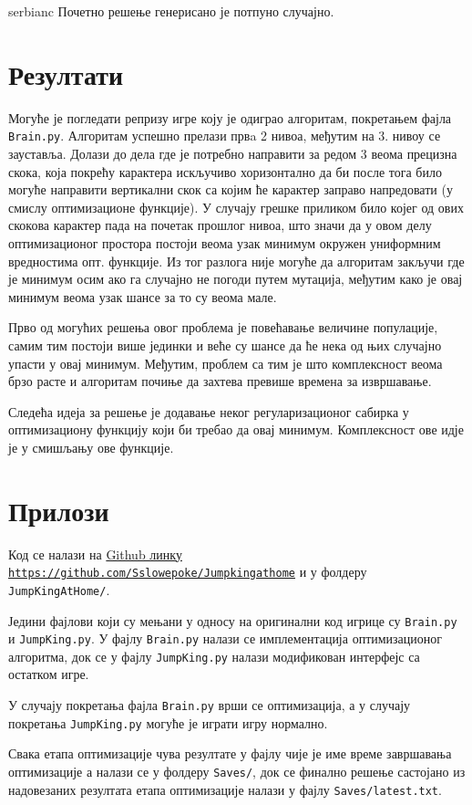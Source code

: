 \documentclass{article}
\begin{document}
\begin{otherlanguage*}{serbianc}
Почетно решење генерисано је потпуно случајно.


\section{Резултати}
Могуће је погледати репризу игре коју је одиграо алгоритам, покретањем фајла
\texttt{Brain.py}.
Алгоритам успешно прелази првa 2 нивоа, међутим на 3. нивоу се зауставља.
Долази до дела где је потребно направити за редом 3 веома прецизна скока, која покрећу карактера искључиво
хоризонтално да би после тога било могуће направити вертикални скок са којим ће карактер заправо напредовати
(у смислу оптимизационе функције).
У случају грешке приликом било којег од ових  скокова карактер пада на почетак прошлог
нивоа, што значи да у овом делу оптимизационог простора постоји веома узак минимум окружен униформним вредностима
опт. функције. Из тог разлога није могуће да алгоритам закључи где је минимум осим ако га
случајно не погоди путем мутација, међутим како је овај минимум веома узак шансе за то су веома мале.

Прво од могућих решења овог проблема је повећавање величине популације, самим тим постоји више јединки и веће
су шансе да ће нека од њих случајно упасти у овај минимум. Међутим, проблем са тим је што комплексност веома брзо расте
и алгоритам почиње да захтева превише времена за извршавање.

Следећа идеја за решење је додавање неког регуларизационог сабирка у оптимизациону функцију који би требао
да \cite{прошири} овај минимум. Комплексност ове идје је у смишљању ове функције.





\section{Прилози}

Код се налази на
\href{https://github.com/Sslowepoke/Jumpkingathome}%
{Github линку \texttt{https://github.com/Sslowepoke/Jumpkingathome}}
и у фолдеру \texttt{JumpKingAtHome/}.

Једини фајлови који су мењани у односу на оригинални код игрице су
\texttt{Brain.py} и \texttt{JumpKing.py}.
У фајлу \texttt{Brain.py} налази се имплементација оптимизационог алгоритма, док се
у фајлу \texttt{JumpKing.py} налази модификован интерфејс са остатком игре.

У случају покретања фајла \texttt{Brain.py} врши се оптимизација,
а у случају покретања \texttt{JumpKing.py} могуће је играти игру нормално.

Свака етапа оптимизације чува резултате у фајлу чије је име време завршавања оптимизације
а налази се у фолдеру \texttt{Saves/}, док се финално решење састојано из надовезаних резултата
етапа оптимизације налази у фајлу \texttt{Saves/latest.txt}.



\end{otherlanguage*}
\end{document}
